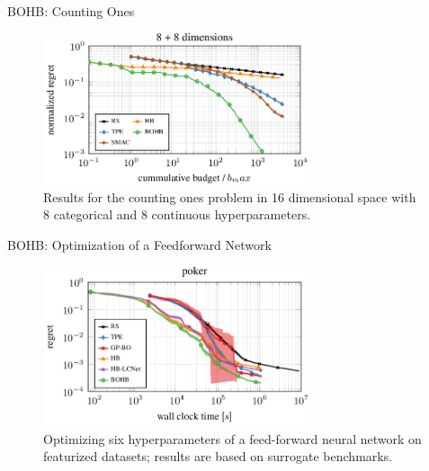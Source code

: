 \begin{frame}{BOHB: Counting Ones }
\begin{figure}
    \centering
    \includegraphics[width=0.70\textwidth]{../w07_hpo_speedup/images/bohb/countingones_bohb.png}
    \caption{Results for the counting ones problem in 16 dimensional
space with 8 categorical and 8 continuous hyperparameters.}
\end{figure}

\end{frame}
\begin{frame}{BOHB: Optimization of a Feedforward Network}
\begin{figure}
\vspace*{-0.2cm}
    \centering
    \includegraphics[width=0.70\textwidth]{../w07_hpo_speedup/images/bohb/surrogate_on_poker.png}
    \caption{Optimizing six hyperparameters of a feed-forward neural
network on featurized datasets; results are based on surrogate
benchmarks. }
\end{figure}

\end{frame}

